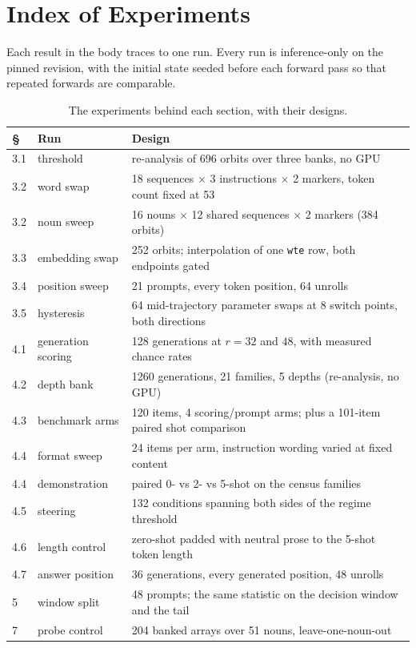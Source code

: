 \documentclass{zapiski}
\begin{document}
\section{Index of Experiments}

Each result in the body traces to one run. Every run is inference-only on the pinned revision,
with the initial state seeded before each forward pass so that repeated forwards are comparable.

\begin{table}[H]
\centering
\small
\caption{The experiments behind each section, with their designs.}
\begin{tabularx}{\linewidth}{@{}llX@{}}
\toprule
\textbf{\S} & \textbf{Run} & \textbf{Design} \\
\midrule
3.1 & threshold & re-analysis of 696 orbits over three banks, no GPU \\
3.2 & word swap & 18 sequences $\times$ 3 instructions $\times$ 2 markers, token count fixed at 53 \\
3.2 & noun sweep & 16 nouns $\times$ 12 shared sequences $\times$ 2 markers (384 orbits) \\
3.3 & embedding swap & 252 orbits; interpolation of one \texttt{wte} row, both endpoints gated \\
3.4 & position sweep & 21 prompts, every token position, 64 unrolls \\
3.5 & hysteresis & 64 mid-trajectory parameter swaps at 8 switch points, both directions \\
4.1 & generation scoring & 128 generations at $r = 32$ and $48$, with measured chance rates \\
4.2 & depth bank & 1260 generations, 21 families, 5 depths (re-analysis, no GPU) \\
4.3 & benchmark arms & 120 items, 4 scoring/prompt arms; plus a 101-item paired shot comparison \\
4.4 & format sweep & 24 items per arm, instruction wording varied at fixed content \\
4.4 & demonstration & paired 0- vs 2- vs 5-shot on the census families \\
4.5 & steering & 132 conditions spanning both sides of the regime threshold \\
4.6 & length control & zero-shot padded with neutral prose to the 5-shot token length \\
4.7 & answer position & 36 generations, every generated position, 48 unrolls \\
5 & window split & 48 prompts; the same statistic on the decision window and the tail \\
7 & probe control & 204 banked arrays over 51 nouns, leave-one-noun-out \\
\bottomrule
\end{tabularx}
\end{table}
\end{document}
